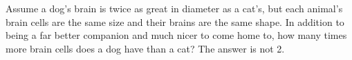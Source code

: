Assume a dog's brain is twice as great in diameter as a
cat's, but each animal's brain cells are the same size and
their brains are the same shape. In addition to being a far
better companion and much nicer to come home to, how many
times more brain cells does a dog have than a cat?
The answer is not 2.
